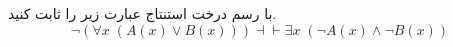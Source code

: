 
	 با رسم درخت استنتاج عبارت زیر را ثابت کنید.
	 $$
	 	\neg (\forall x \;(A(x) \vee B(x))) \dashv\vdash \exists x \; (\neg A(x) \wedge \neg B(x))
	 $$
